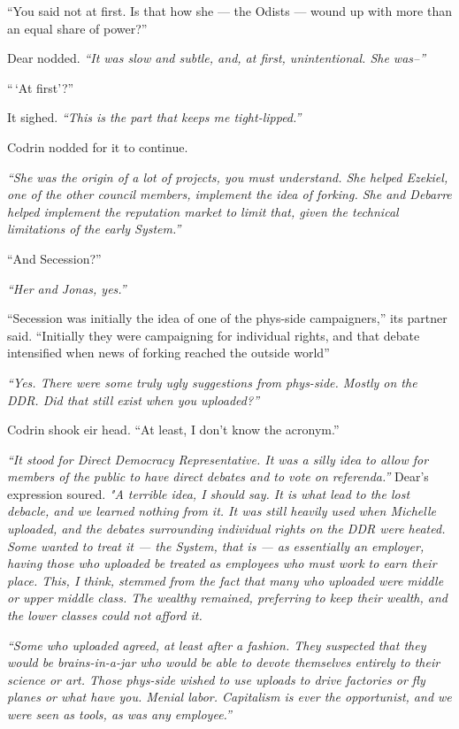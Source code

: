 ``You said not at first. Is that how she — the Odists — wound up with more than an equal share of power?''

Dear nodded. \emph{``It was slow and subtle, and, at first, unintentional. She was--''}

``\,`At first'?''

It sighed. \emph{``This is the part that keeps me tight-lipped.''}

Codrin nodded for it to continue.

\emph{``She was the origin of a lot of projects, you must understand. She helped Ezekiel, one of the other council members, implement the idea of forking. She and Debarre helped implement the reputation market to limit that, given the technical limitations of the early System.''}

``And Secession?''

\emph{``Her and Jonas, yes.''}

``Secession was initially the idea of one of the phys-side campaigners,'' its partner said. ``Initially they were campaigning for individual rights, and that debate intensified when news of forking reached the outside world''

\emph{``Yes. There were some truly ugly suggestions from phys-side. Mostly on the DDR. Did that still exist when you uploaded?''}

Codrin shook eir head. ``At least, I don't know the acronym.''

\emph{``It stood for Direct Democracy Representative. It was a silly idea to allow for members of the public to have direct debates and to vote on referenda.''} Dear's expression soured. \emph{"A terrible idea, I should say. It is what lead to the lost debacle, and we learned nothing from it. It was still heavily used when Michelle uploaded, and the debates surrounding individual rights on the DDR were heated. Some wanted to treat it — the System, that is — as essentially an employer, having those who uploaded be treated as employees who must work to earn their place. This, I think, stemmed from the fact that many who uploaded were middle or upper middle class. The wealthy remained, preferring to keep their wealth, and the lower classes could not afford it.}

\emph{``Some who uploaded agreed, at least after a fashion. They suspected that they would be brains-in-a-jar who would be able to devote themselves entirely to their science or art. Those phys-side wished to use uploads to drive factories or fly planes or what have you. Menial labor. Capitalism is ever the opportunist, and we were seen as tools, as was any employee.''}

